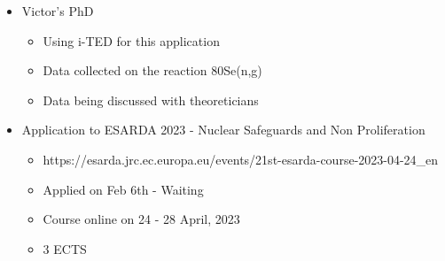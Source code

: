 \begin{itemize}
    \item Victor's PhD
    \begin{itemize}
        \item Using i-TED for this application
        \item Data collected on the reaction 80Se(n,g)
        \item Data being discussed with theoreticians
    \end{itemize}
    \item Application to ESARDA 2023 - Nuclear Safeguards and Non Proliferation
    \begin{itemize}
        \item https://esarda.jrc.ec.europa.eu/events/21st-esarda-course-2023-04-24_en
        \item Applied on Feb 6th - Waiting
        \item Course online on 24 - 28 April, 2023
        \item 3 ECTS
    \end{itemize}
\end{itemize}